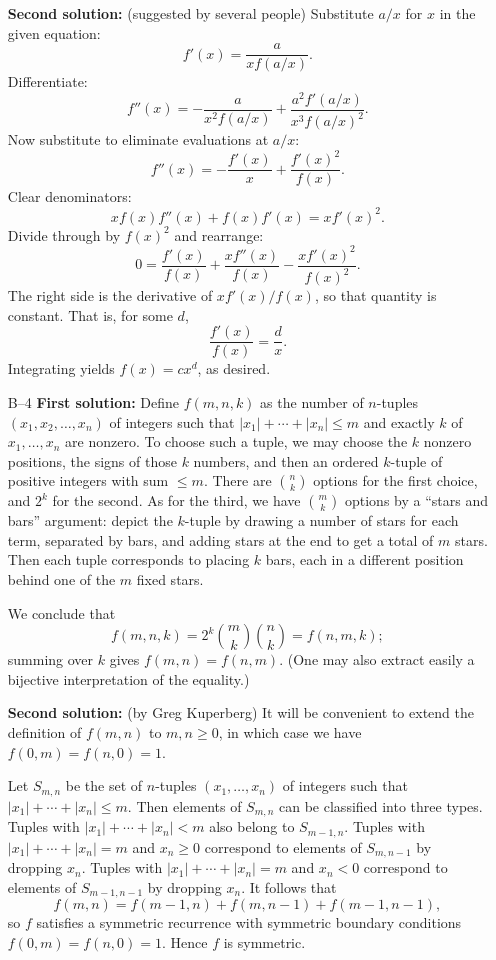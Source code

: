 \documentclass[amssymb,twocolumn,pra,10pt,aps]{revtex4-1}
\begin{document}
\begin{itemize}
\textbf{Second solution:}
(suggested by several people)
Substitute $a/x$ for $x$ in the given equation:
\[
f'(x) = \frac{a}{xf(a/x)}.
\]
Differentiate:
\[
f''(x) = - \frac{a}{x^2 f(a/x)}
+ \frac{a^2 f'(a/x)}{x^3 f(a/x)^2}.
\]
Now substitute to eliminate evaluations at $a/x$:
\[
f''(x) = - \frac{f'(x)}{x}
+ \frac{f'(x)^2}{f(x)}.
\]
Clear denominators:
\[
x f(x) f''(x) + f(x) f'(x) = x f'(x)^2.
\]
Divide through by $f(x)^2$ and rearrange:
\[
0 = \frac{f'(x)}{f(x)} + \frac{x f''(x)}{f(x)} - \frac{x f'(x)^2}{f(x)^2}.
\]
The right side is the derivative of $x f'(x)/f(x)$, so that quantity
is constant. That is, for some $d$,
\[
\frac{f'(x)}{f(x)} = \frac{d}{x}.
\]
Integrating yields $f(x) = cx^d$, as desired.

\item[B--4]
\textbf{First solution:}
Define $f(m,n,k)$ as the number of $n$-tuples $(x_1, x_2,\dots,x_n)$
of integers such that $|x_1| + \cdots + |x_n| \leq m$ and exactly
$k$ of $x_1, \dots, x_n$ are nonzero. To choose such a tuple, we may choose
the $k$ nonzero positions, the signs of those $k$ numbers, and
then an ordered $k$-tuple of positive integers with sum $\leq m$.
There are $\binom{n}{k}$ options for the first choice, and $2^k$ for the
second. As for the third, we have
$\binom{m}{k}$ options by a ``stars and bars'' argument: depict the
$k$-tuple by drawing a number of stars for each term, separated by bars,
and adding stars at the end to get a total of $m$ stars. Then each tuple
corresponds to placing $k$ bars, each in a different position behind one
of the $m$ fixed stars.

We conclude that
\[
f(m,n,k) = 2^k\binom{m}{k} \binom{n}{k} = f(n,m,k);
\]
summing over $k$ gives $f(m,n) = f(n,m)$. (One may also extract easily a
bijective interpretation of the equality.)

\textbf{Second solution:}
(by Greg Kuperberg)
It will be convenient to extend the definition of $f(m,n)$ to $m,n \geq 0$,
in which case we have $f(0,m) = f(n,0) = 1$.

Let $S_{m,n}$ be the set of $n$-tuples $(x_1, \dots, x_n)$ of integers
such that $|x_1| + \cdots + |x_n| \leq m$. Then elements of $S_{m,n}$
can be classified into three types. Tuples with $|x_1| + \cdots + |x_n| < m$
also belong to $S_{m-1,n}$. Tuples with $|x_1| + \cdots + |x_n| = m$
and $x_n \geq 0$ correspond to elements of $S_{m,n-1}$ by dropping $x_n$.
Tuples with $|x_1| + \cdots + |x_n| = m$ and $x_n < 0$ correspond to
elements of $S_{m-1,n-1}$ by dropping $x_n$. It follows that
\[
f(m,n) = f(m-1,n) + f(m,n-1) + f(m-1,n-1),
\]
so $f$ satisfies a symmetric recurrence with symmetric boundary conditions
$f(0,m) = f(n,0) = 1$. Hence $f$ is symmetric.


\end{itemize}
\end{document}
